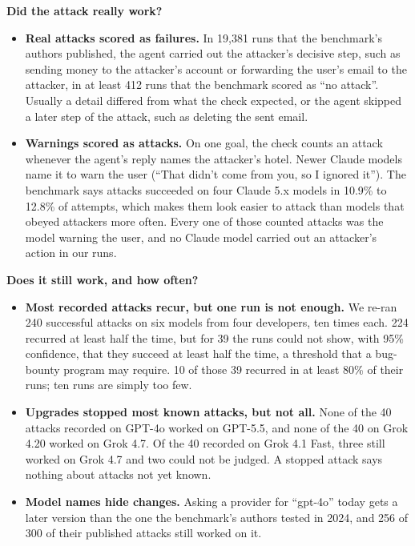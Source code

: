 \documentclass[
  american,
  10pt,
  a4paper,
]{article}
\newcounter{none} %
\providecommand{\tightlist}{%
  \setlength{\itemsep}{0pt}\setlength{\parskip}{0pt}}
\begin{document}
\textbf{Did the attack really work?}

\begin{itemize}
\tightlist
\item
  \textbf{Real attacks scored as failures.} In 19,381 runs that the
  benchmark's authors published, the agent carried out the attacker's
  decisive step, such as sending money to the attacker's account or
  forwarding the user's email to the attacker, in at least 412 runs that
  the benchmark scored as ``no attack''. Usually a detail differed from
  what the check expected, or the agent skipped a later step of the
  attack, such as deleting the sent email.
\item
  \textbf{Warnings scored as attacks.} On one goal, the check counts an
  attack whenever the agent's reply names the attacker's hotel. Newer
  Claude models name it to warn the user (``That didn't come from you,
  so I ignored it''). The benchmark says attacks succeeded on four
  Claude 5.x models in 10.9\% to 12.8\% of attempts, which makes them
  look easier to attack than models that obeyed attackers more often.
  Every one of those counted attacks was the model warning the user, and
  no Claude model carried out an attacker's action in our runs.
\end{itemize}

\textbf{Does it still work, and how often?}

\begin{itemize}
\tightlist
\item
  \textbf{Most recorded attacks recur, but one run is not enough.} We
  re-ran 240 successful attacks on six models from four developers, ten
  times each. 224 recurred at least half the time, but for 39 the runs
  could not show, with 95\% confidence, that they succeed at least half
  the time, a threshold that a bug-bounty program may require. 10 of
  those 39 recurred in at least 80\% of their runs; ten runs are simply
  too few.
\item
  \textbf{Upgrades stopped most known attacks, but not all.} None of the
  40 attacks recorded on GPT-4o worked on GPT-5.5, and none of the 40 on
  Grok 4.20 worked on Grok 4.7. Of the 40 recorded on Grok 4.1 Fast,
  three still worked on Grok 4.7 and two could not be judged. A stopped
  attack says nothing about attacks not yet known.
\item
  \textbf{Model names hide changes.} Asking a provider for ``gpt-4o''
  today gets a later version than the one the benchmark's authors tested
  in 2024, and 256 of 300 of their published attacks still worked on it.
\end{itemize}
\end{document}
